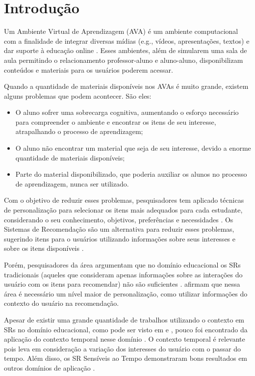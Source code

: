 \chapter{Introdução}\label{introducao}

Um Ambiente Virtual de Aprendizagem (AVA) é um ambiente computacional com a finalidade de integrar diversas mídias
(e.g., vídeos, apresentações, textos) e dar suporte à educação online \cite{drachsler2015panorama}. Esses ambientes, além de simularem uma sala
de aula permitindo o relacionamento professor-aluno e aluno-aluno, disponibilizam conteúdos e materiais para os usuários
poderem acessar.

Quando a quantidade de materiais disponíveis nos AVAs é muito grande, existem alguns problemas que podem acontecer. São eles:

\begin{itemize}
\item O aluno sofrer uma sobrecarga cognitiva, aumentando o esforço necessário para compreender o ambiente
e encontrar os itens de seu interesse, atrapalhando o processo de aprendizagem;
\item O aluno não encontrar um material que seja de seu interesse, devido a enorme quantidade de materiais disponíveis;
\item Parte do material disponibilizado, que poderia auxiliar os alunos no processo de aprendizagem, nunca ser
utilizado.
\end{itemize}

Com o objetivo de reduzir esses problemas, pesquisadores tem aplicado técnicas de personalização para selecionar os
itens mais adequados para cada estudante, considerando o seu conhecimento, objetivos, preferências e necessidades
\cite{brusilovsky1998methods}. Os Sistemas de Recomendação são um alternativa para reduzir esses problemas, sugerindo
itens para o usuários utilizando informações sobre seus interesses e sobre os itens disponíveis \cite{adomavicius2005toward}.

Porém, pesquisadores da área argumentam que no domínio educacional os SRs tradicionais (aqueles que consideram apenas
informações sobre as interações do usuário com os itens para recomendar) não são suficientes \cite{verbert2012context, drachsler2015panorama}.
 afirmam que nessa área é necessário um nível maior de personalização, como utilizar informações
do contexto do usuário na recomendação.

Apesar de existir uma grande quantidade de trabalhos utilizando o contexto em SRs no domínio educacional, como pode ser visto
em  e , pouco foi encontrado da aplicação do contexto
temporal nesse domínio \cite{de2017time}. O contexto temporal é relevante pois leva em consideração a variação dos
interesses do usuário com o passar do tempo. Além disso, os SR Sensíveis ao Tempo demonstraram bons resultados em outros
domínios de aplicação \cite{campos2014time}.

